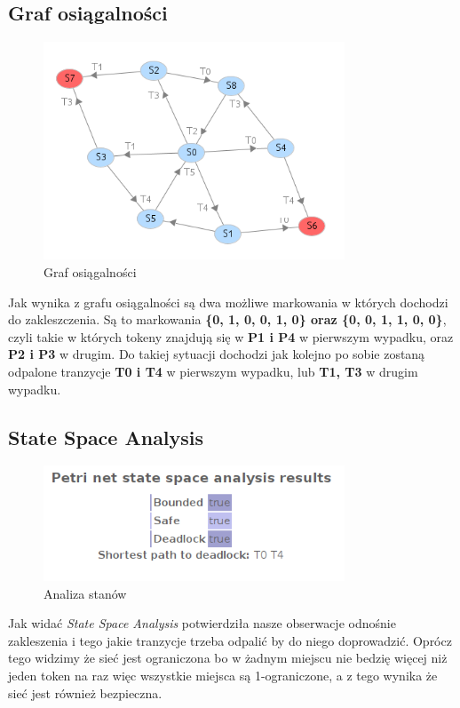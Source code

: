 \documentclass{article}
\begin{document}
\subsection{Graf osiągalności}
\begin{figure}[H]
    \centering
    \includegraphics[width=0.8\textwidth, height=0.4\textheight]{zad6_graph.png}
    \caption{Graf osiągalności}
\end{figure}

Jak wynika z grafu osiągalności są dwa możliwe markowania w których dochodzi do zakleszczenia.
Są to markowania \textbf{\{0, 1, 0, 0, 1, 0\} oraz \{0, 0, 1, 1, 0, 0\}}, czyli takie w których tokeny znajdują się
w \textbf{P1 i P4} w pierwszym wypadku, oraz \textbf{P2 i P3} w drugim. Do takiej sytuacji dochodzi jak kolejno po sobie 
zostaną odpalone tranzycje \textbf{T0 i T4} w pierwszym wypadku, lub \textbf{T1, T3} w drugim wypadku.
\subsection{State Space Analysis}
\begin{figure}[H]
    \centering
    \includegraphics[width=0.8\textwidth, height=0.4\textheight]{zad6_analiza.png}
    \caption{Analiza stanów}
\end{figure}

Jak widać \textit{State Space Analysis} potwierdziła nasze obserwacje odnośnie zakleszenia i 
tego jakie tranzycje trzeba odpalić by do niego doprowadzić. Oprócz tego widzimy że sieć jest 
ograniczona bo w żadnym miejscu nie bedzię więcej niż jeden token na raz więc wszystkie miejsca
są 1-ograniczone, a z tego wynika że sieć jest również bezpieczna.
\end{document}
